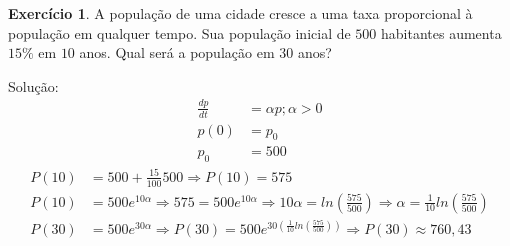 \documentclass[a4paper,12pt,reqno,natbib]{amsart}
\theoremstyle{definition}
\newtheorem{exercise}{Exerc\'icio}
\newcommand{\derivada}[2]{\frac{#1}{#2}}
\begin{document}
\vspace{0.6 cm}

\begin{exercise}
A população de uma cidade cresce a uma taxa proporcional à população em qualquer tempo. Sua população inicial de $500$ habitantes aumenta $15\%$ em $10$ anos. Qual será a população em $30$ anos?
\end{exercise}
Solu\c c\~ao:
\begin{align*}
	\derivada{dp}{dt}  &= \alpha p; \alpha > 0 \\
	p(0) &= p_0\\
	p_0 &= 500
\end{align*}
\begin{align*}
	P(10) &= 500 + \frac{15}{100}500 \Rightarrow P(10) = 575\\
	P(10) &= 500e^{10\alpha} \Rightarrow 575 = 500e^{10\alpha} \Rightarrow 10\alpha = ln(\frac{575}{500}) \Rightarrow
	\alpha = \frac{1}{10}ln(\frac{575}{500})\\
	P(30) &= 500e^{30\alpha} \Rightarrow P(30) = 500e^{30(\frac{1}{10}ln(\frac{575}{500}))} \Rightarrow P(30) \approx 760,43
\end{align*}

\vspace{0.6 cm}
\end{document}

